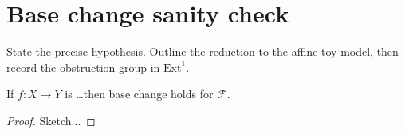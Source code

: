 \section{Base change sanity check}
State the precise hypothesis. Outline the reduction to the affine toy model,
then record the obstruction group in $\mathrm{Ext}^1$.

\begin{lemma}
If $f:X\to Y$ is \ldots then base change holds for $\mathcal F$.
\end{lemma}
\begin{proof}
Sketch...
\end{proof}
